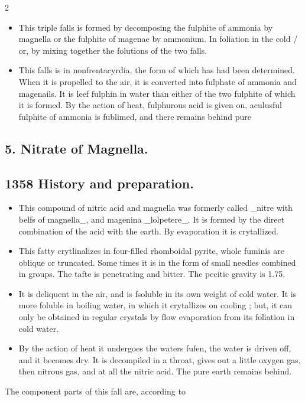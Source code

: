 \documentclass[10pt]{article}
\begin{document}
\begin{multicols}{2}
\begin{itemize}\setlength{\itemsep}{1pt}
\item This triple falls is formed by decomposing the fulphite of ammonia by magnella or the fulphite of magenae by ammonium. In foliation in the cold / or, by mixing together the folutions of the two falls.
\item This falls is in nonfrentacyrdia, the form of which has had been determined. When it is propelled to the air, it is converted into fulphate of ammonia and magenails. It is leef fulphin in water than either of the two fulphite of which it is formed. By the action of heat, fulphurous acid is given on, aculusful fulphite of ammonia is fublimed, and there remains behind pure
\end{itemize}
\subsection*{5. Nitrate of Magnella.}
\subsection*{1358 History and preparation.}
\begin{itemize}\setlength{\itemsep}{1pt}
\item This compound of nitric acid and magnella was formerly called \_nitre with belfs of magnella\_, and magenina \_lolpetere\_. It is formed by the direct combination of the acid with the earth. By evaporation it is crytallized.
\item This fatty crytlinalizes in four-filled rhomboidal pyrite, whole fuminis are oblique or truncated. Some times it is in the form of small needles combined in groups. The tafte is penetrating and bitter. The pecitic gravity is 1.75.
\item It is deliquent in the air, and is fsoluble in its own weight of cold water. It is more foluble in boiling water, in which it crytallizes on cooling ; but, it can only be obtained in regular crystals by flow evaporation from its foliation in cold water.
\item By the action of heat it undergoes the waters fufen, the water is driven off, and it becomes dry. It is decompiled in a throat, gives out a little oxygen gas, then nitrous gas, and at all the nitric acid. The pure earth remains behind.
\end{itemize}
The component parts of this fall are, according to


\end{multicols}
\end{document}
